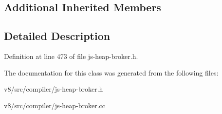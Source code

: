 \subsection*{Additional Inherited Members}


\subsection{Detailed Description}


Definition at line 473 of file js-\/heap-\/broker.\+h.



The documentation for this class was generated from the following files\+:\begin{DoxyCompactItemize}
\item 
v8/src/compiler/js-\/heap-\/broker.\+h\item 
v8/src/compiler/js-\/heap-\/broker.\+cc\end{DoxyCompactItemize}
